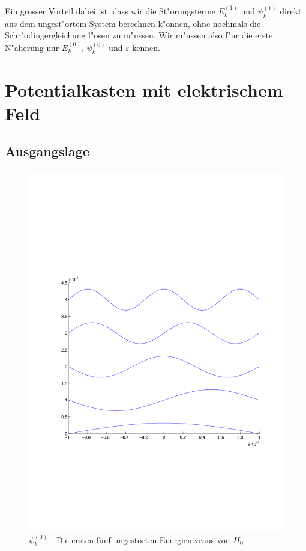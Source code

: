 \begin{refsection}
Ein grosser Vorteil dabei ist,
dass wir die St"orungsterme $E_k^{(1)}$ und $\psi_k^{(1)}$
direkt aus dem ungest"ortem System berechnen k"onnen,
ohne nochmals die Schr"odingergleichung l"osen zu m"ussen.
Wir m"ussen also f"ur die erste N"aherung nur $E_k^{(0)}$,
$\psi_k^{(0)}$ und $\varepsilon$ kennen.




\section{Potentialkasten mit elektrischem Feld}

\subsection{Ausgangslage}

\begin{figure}
 \centering
 \includegraphics[width=12cm,clip=true,trim=2cm 7cm 1cm 8cm]{efeld/Psi_ungestoert.pdf}
 \caption{$\psi_k^{(0)}$ - Die ersten f\"unf ungest\"orten Energieniveaus von $H_0$ }
 \label{abb:efeld_psi_ungestoert}
\end{figure}


\end{refsection}
